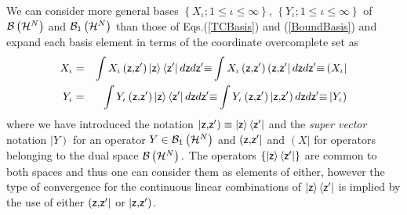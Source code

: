 We can consider more general bases $\left\{ X_{\iota };1\leq \iota \leq
\infty \right\} $, $\left\{ Y_{\iota };1\leq \iota \leq \infty \right\} $ of 
${\cal B}\left( {\cal H}^{N}\right) $ and ${\cal B}_{1}\left( {\cal H}%
^{N}\right) $ than those of Eqs.(\ref{TCBasis}) and (\ref{BoundBasis}) and
expand each basis element in terms of the coordinate overcomplete set as%
\begin{eqnarray}
X_{\iota } &=&\int X_{\iota }\left( {\sf z}{\bf ,}{\sf z}^{\prime }\right)
\left| {\sf z}\right\rangle \left\langle {\sf z}^{\prime }\right| d{\sf z}d%
{\sf z}^{\prime }{\bf \equiv }\int X_{\iota }\left( {\sf z}{\bf ,}{\sf z}%
^{\prime }\right) \left( {\sf z}{\bf ,}{\sf z}^{\prime }\right| d{\sf z}d%
{\sf z}^{\prime }{\bf \equiv }\left( X_{\iota }\right|  \nonumber \\
Y_{\iota } &=&\int Y_{\iota }\left( {\sf z}{\bf ,}{\sf z}^{\prime }\right)
\left| {\sf z}\right\rangle \left\langle {\sf z}^{\prime }\right| d{\sf z}d%
{\sf z}^{\prime }{\bf \equiv }\int Y_{\iota }\left( {\sf z}{\bf ,}{\sf z}%
^{\prime }\right) \left| {\sf z}{\bf ,}{\sf z}^{\prime }\right) d{\sf z}d%
{\sf z}^{\prime }{\bf \equiv }\left| Y_{\iota }\right)  \label{Overcomplete}
\end{eqnarray}%
where we have introduced the notation $\left| {\sf z}{\bf ,}{\sf z}^{\prime
}\right) \equiv \left| {\sf z}\right\rangle \left\langle {\sf z}^{\prime
}\right| $ and the {\it super vector} notation $\left| Y\right) $ for an
operator $Y\in {\cal B}_{1}\left( {\cal H}^{N}\right) $ and $\left( {\sf z}%
{\bf ,}{\sf z}^{\prime }\right| $ and $\left( X\right| $ for operators
belonging to the dual space ${\cal B}\left( {\cal H}^{N}\right) .$ The
operators $\left\{ \left| {\sf z}\right\rangle \left\langle {\sf z}^{\prime
}\right| \right\} $ are common to both spaces and thus one can consider them
as elements of either, however the type of convergence for the continuous
linear combinations of $\left| {\sf z}\right\rangle \left\langle {\sf z}%
^{\prime }\right| $ is implied by the use of either $\left( {\sf z}{\bf ,}%
{\sf z}^{\prime }\right| $ or $\left| {\sf z}{\bf ,}{\sf z}^{\prime }\right) 
$.

